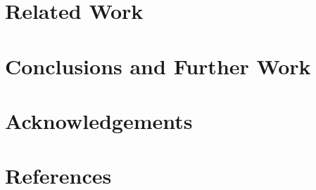 \section{Related Work}
\label{sec:related-work}

\section{Conclusions and Further Work}
\label{sec:conclusions}






\section*{Acknowledgements}
\label{sec:acknowledgements}



\section{References}
\label{sec:references}







